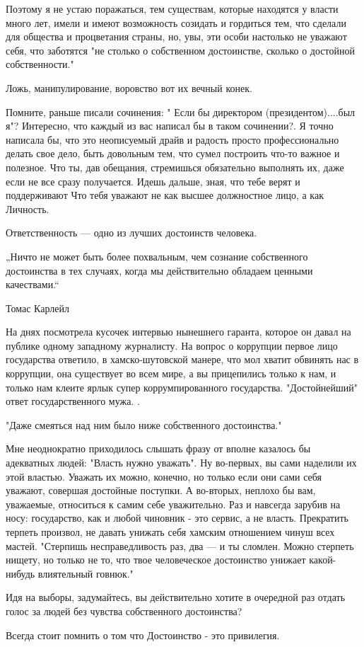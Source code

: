 Поэтому я  не устаю поражаться, тем существам, которые находятся у власти много
лет, имели и имеют возможность созидать и гордиться тем, что сделали для
общества и процветания страны, но, увы, эти особи настолько не уважают себя,
что заботятся "не столько о собственном достоинстве, сколько о достойной
собственности."

Ложь, манипулирование, воровство вот их вечный конек.  

Помните, раньше писали сочинения: " Если бы директором (президентом)....был я"?
Интересно, что каждый из вас написал бы в таком сочинении?. Я точно написала
бы, что это неописуемый драйв и радость просто профессионально  делать свое
дело, быть довольным тем, что сумел построить что-то  важное и полезное. Что
ты, дав обещания, стремишься обязательно выполнять их, даже если не все сразу
получается.  Идешь дальше, зная, что тебе верят и поддерживают   Что тебя
уважают не как высшее должностное лицо, а как Личность. 

 Ответственность — одно из лучших достоинств человека.

„Ничто не может быть более похвальным, чем сознание собственного достоинства в
тех случаях, когда мы действительно обладаем ценными качествами.“ 

Томас Карлейл

На днях посмотрела кусочек интервью нынешнего гаранта, которое он давал на
публике одному западному журналисту. На вопрос о коррупции  первое лицо
государства ответило, в хамско-шутовской манере,   что мол хватит обвинять нас
в коррупции, она существует во всем мире, а вы прицепились только к нам, и
только нам  клеите ярлык супер коррумпированного государства. "Достойнейший"
ответ государственного мужа. . 

"Даже смеяться над ним было ниже собственного достоинства."

Мне неоднократно приходилось слышать фразу от вполне казалось бы адекватных
людей: "Власть нужно уважать". Ну во-первых, вы сами наделили их этой властью.
Уважать их можно, конечно, но только если они сами себя уважают, совершая
достойные поступки. А во-вторых,  неплохо бы вам, уважаемые,   относиться к
самим себе уважительно. Раз и навсегда зарубив  на носу: государство, как и
любой чиновник - это сервис, а не власть. Прекратить терпеть произвол, не
давать  унижать себя хамским отношением чинуш всех мастей. "Стерпишь
несправедливость раз, два — и ты сломлен. Можно стерпеть нищету, но только не
то, что твое человеческое достоинство унижает какой-нибудь влиятельный говнюк." 

Идя на выборы, задумайтесь, вы действительно хотите в очередной раз отдать
голос за людей без чувства собственного достоинства?

Всегда стоит помнить о том что Достоинство - это привилегия.
